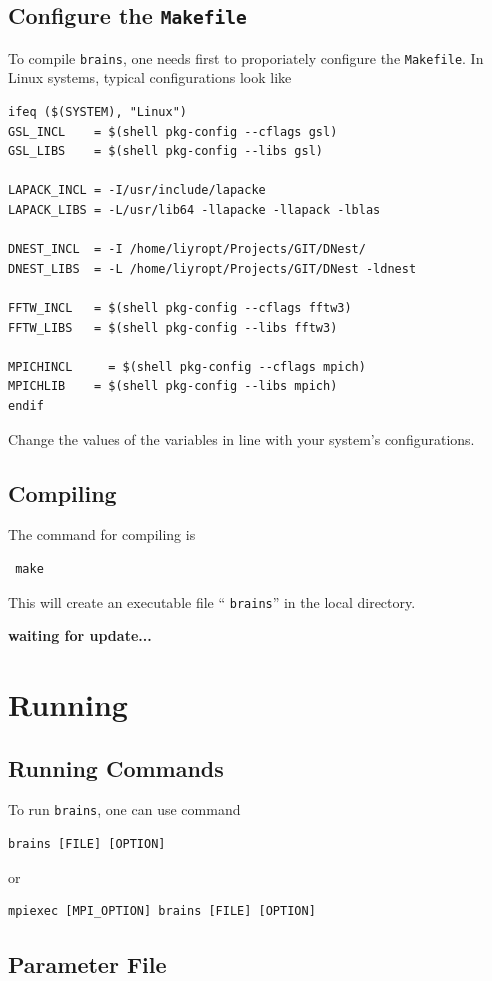 \documentclass[oneside]{book}
\def\brains{{\texttt{brains}}}
\begin{document}
\section{Configure the \texttt{Makefile}}
To compile {\brains}, one needs first to proporiately configure the \texttt{Makefile}. In Linux systems, typical configurations look like
\begin{verbatim}
ifeq ($(SYSTEM), "Linux")
GSL_INCL    = $(shell pkg-config --cflags gsl)
GSL_LIBS    = $(shell pkg-config --libs gsl) 

LAPACK_INCL = -I/usr/include/lapacke
LAPACK_LIBS = -L/usr/lib64 -llapacke -llapack -lblas

DNEST_INCL  = -I /home/liyropt/Projects/GIT/DNest/
DNEST_LIBS  = -L /home/liyropt/Projects/GIT/DNest -ldnest

FFTW_INCL   = $(shell pkg-config --cflags fftw3) 
FFTW_LIBS   = $(shell pkg-config --libs fftw3) 

MPICHINCL     = $(shell pkg-config --cflags mpich) 
MPICHLIB    = $(shell pkg-config --libs mpich) 
endif
\end{verbatim}
Change the values of the variables in line with your system's configurations.

\section{Compiling}
The command for compiling is 
\begin{verbatim}
 make
\end{verbatim}
This will create an executable file `` \texttt{brains}'' in the local directory.

{\bf waiting for update...}

\chapter{Running}

\section{Running Commands}
To run \texttt{brains}, one can use command
\begin{verbatim}
brains [FILE] [OPTION]
\end{verbatim}
or
\begin{verbatim}
mpiexec [MPI_OPTION] brains [FILE] [OPTION]
\end{verbatim}

\section{Parameter File}
\end{document}
